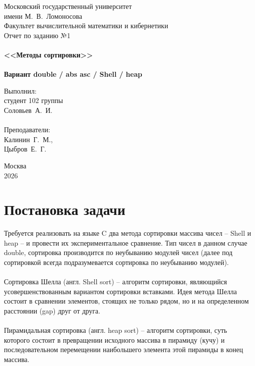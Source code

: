 \documentclass[a4paper,12pt,titlepage,finall]{article}
\begin{document}
\begin{titlepage}
    \begin{center}
	{\small \sc Московский государственный университет \\имени М.~В.~Ломоносова\\
	Факультет вычислительной математики и кибернетики\\}
	\vfill
	{\Large \sc Отчет по заданию №1}\\
	~\\
	{\large \bf <<Методы сортировки>>}\\ 
	~\\
	{\large \bf Вариант double / abs asc / Shell / heap}
    \end{center}
    \begin{flushright}
	\vfill {Выполнил:\\
	студент 102 группы\\
	Соловьев~А.~И.\\
	~\\
	Преподаватели:\\
	Калинин~Г.~М.,\\
        Цыбров~Е.~Г.}
    \end{flushright}
    \begin{center}
	\vfill
	{\small Москва\\2026}
    \end{center}
\end{titlepage}

\begin{center}
\tableofcontents
\end{center}
\newpage

\section{Постановка задачи}

Требуется реализовать на языке C два метода сортировки массива чисел -- Shell и heap -- и провести их экспериментальное сравнение. Тип чисел в данном случае double, сортировка производится по неубыванию модулей чисел (далее под сортировкой всегда подразумевается сортировка по неубыванию модулей).\\\\
Сортировка Шелла (англ. Shell sort) -- алгоритм сортировки, являющийся усовершенствованным вариантом сортировки вставками. Идея метода Шелла состоит в сравнении элементов, стоящих не только рядом, но и на определенном расстоянии (gap) друг от друга.\\\\
Пирамидальная сортировка (англ. heap sort) -- алгоритм сортировки, суть которого состоит в превращении исходного массива в пирамиду (кучу) и последовательном перемещении наибольшего элемента этой пирамиды в конец массива.\\\\
\newpage
\end{document}
